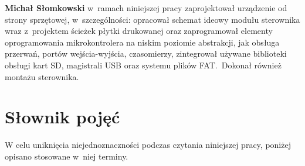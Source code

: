 \textbf{Michał Słomkowski} w~ramach niniejszej pracy zaprojektował urządzenie od strony sprzętowej, w~szczególności: opracował schemat ideowy modułu sterownika wraz z~projektem ścieżek płytki drukowanej oraz zaprogramował elementy oprogramowania mikrokontrolera na niskim poziomie abstrakcji, jak obsługa przerwań, portów wejścia-wyjścia, czasomierzy, zintegrował używane biblioteki obsługi kart SD, magistrali USB oraz systemu plików FAT.~Dokonał również montażu sterownika.

\section{Słownik pojęć}
\label{slownik}

W celu uniknięcia niejednoznaczności podczas czytania niniejszej pracy, poniżej opisano stosowane w~niej terminy.

